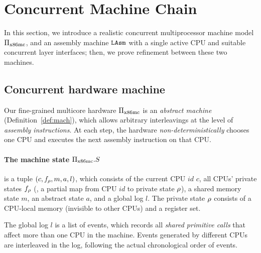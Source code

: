 \newcommand{\PBoot}{\mathsf{PBoot}}
\newcommand{\XAsm}{\mathsf{XAsm}}

\section{Concurrent Machine Chain}
\label{sec:mach}


In this section, we introduce a realistic
concurrent multiprocessor machine model $\Pi_{\text{x86mc}}$,
and an assembly machine ${\texttt{LAsm}}$ with a single active CPU
and suitable concurrent layer interfaces; then, we prove
refinement between these two machines.

\subsection{Concurrent hardware machine}
Our fine-grained multicore hardware $\Pi_{\text{x86mc}}$
is an \emph{abstract machine} (\cf Definition~\ref{def:mach}),
which allows arbitrary
interleavings at the level of \emph{assembly instructions}.
At each step, the hardware \emph{non-deterministically} chooses one CPU 
and executes the next assembly instruction on that CPU.


\paragraph{The machine state $\Pi_{\text{x86mc}}.S$} is a tuple $(c, f_\rho, m, a, l)$,
which consists of 
the current CPU $id$ $c$,
all CPUs' private states $f_\rho$
(\ie, a partial map from CPU $id$ to private state $\rho$),
a shared memory state $m$,
an abstract state $a$, and a global log $l$.
The private state $\rho$ consists of a CPU-local memory
(invisible to other CPUs) and a register set.

The global log $l$ 
is a list of events, which records all \emph{shared primitive calls} that affect more than
one CPU in the machine. Events generated by different CPUs are
interleaved in the log, following the actual chronological order of events.

